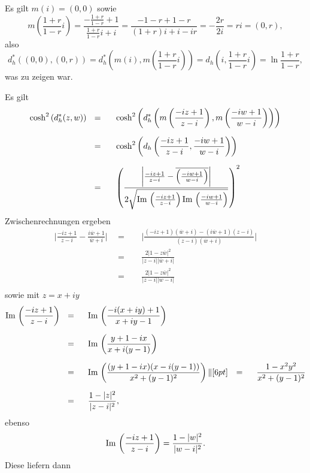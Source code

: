 \documentclass[11pt]{book}
\numberwithin{dummy}{section}
\theoremstyle{nonumberbreak}
\newenvironment{prob}[1][]{\ifthenelse{\equal{#1}{}}{\problem}{\problem[#1]}\rm}{\endproblem}
\newenvironment{sol}[1][]{\ifthenelse{\equal{#1}{}}{\solution}{\solution[#1]}\rm}{\endsolution}
\newcommand{\Imm}{\mathrm{Im}\hspace{1.5pt}}
\begin{document}
\begin{spacing}{1.4}
\begin{prob}
\begin{sol}
\begin{compactenum}
\item \begin{compactenum}
\item Es gilt $m(i)=(0,0)$ sowie
$$m\left( \frac{1+r}{1-r}i\right) = \frac{- \frac{1+r}{1-r} +1}{\frac{1+r}{1-r}i + i} = \frac{-1-r+1-r}{(1+r)i+i-ir} = -\frac{2r}{2i} = ri = (0,r),$$
also 
$$d_h^*((0,0),(0,r)) = d_h^*\left( m(i), m\left(\frac{1+r}{1-r}i\right)\right) = d_h\left(i, \frac{1+r}{1-r}i\right) = \ln \frac{1+r}{1-r},$$
was zu zeigen war.
\item Es gilt
\begin{alignat*}{5}
\cosh^2 \left( d_h^*(z,w)\right) \ \ &=&& \ \ \cosh^2 \left( d_h^*\left( m\left( \frac{-iz+1}{z-i}\right), m\left( \frac{-iw+1}{w-i}\right)\right)\right) \\[6pt]
&=&& \ \ \cosh^2 \left( d_h\left(\frac{-iz+1}{z-i}, \frac{-iw+1}{w-i}\right) \right) \\[6pt]
&=&& \ \ \left( \frac{ \bigg \vert \frac{-iz+1}{z-i} - \overline{\left( \frac{-iw+1}{w-i}\right)} \bigg\vert }{2 \sqrt{ \Imm \left( \frac{-iz+1}{z-i}\right) \Imm\left( \frac{-iw+1}{w-i}\right)}}\right)^2
\end{alignat*}
Zwischenrechnungen ergeben
\begin{alignat*}{5}
\Bigg\vert \frac{-iz+1}{z-i} - \frac{i\overline{w} +1}{\overline{w}+i} \Bigg\vert \ \ &=&& \ \ \Bigg\vert \frac{(-iz+1)(\overline{w}+i) - (i \overline{w}+1)(z-i)}{(z-i)(\overline{w}+i)} \Bigg \vert \\[6pt]
&=&& \ \ \frac{2 \vert 1-z \overline{w}\vert^2}{\vert z-i\vert \vert \overline{w}+i\vert} \\[6pt]
&=&& \ \ \frac{2 \vert 1-z \overline{w}\vert^2}{\vert z-i\vert \vert w-i\vert} \\
\end{alignat*}
sowie mit $z=x+iy$
\newpage
\begin{alignat*}{5}
\Imm\left( \frac{-iz+1}{z-i}\right) \ \ &=&& \ \ \Imm \left( \frac{-i(x+iy)+1}{x+iy-1}\right) \\[6pt]
&=&& \ \ \Imm\left( \frac{y+1-ix}{x+i(y-1)}\right) \\[6pt]
&=&& \ \ \Imm\left( \frac{(y+1-ix)(x-i(y-1))}{x^2+(y-1)^2}\right) \|[6pt]
&=&& \ \ \frac{1-x^2y^2}{x^2+(y-1)^2}\\[6pt]
&=&& \ \ \frac{1-\vert z \vert^2}{\vert z-i\vert^2},
\end{alignat*}
ebenso
$$\Imm\left( \frac{-iz+1}{z-i}\right) = \frac{1-\vert w \vert^2}{\vert w - i \vert^2}.$$
Diese liefern dann 


\end{compactenum}
\end{compactenum}
\end{sol}
\end{prob}
\end{spacing}
\end{document}
